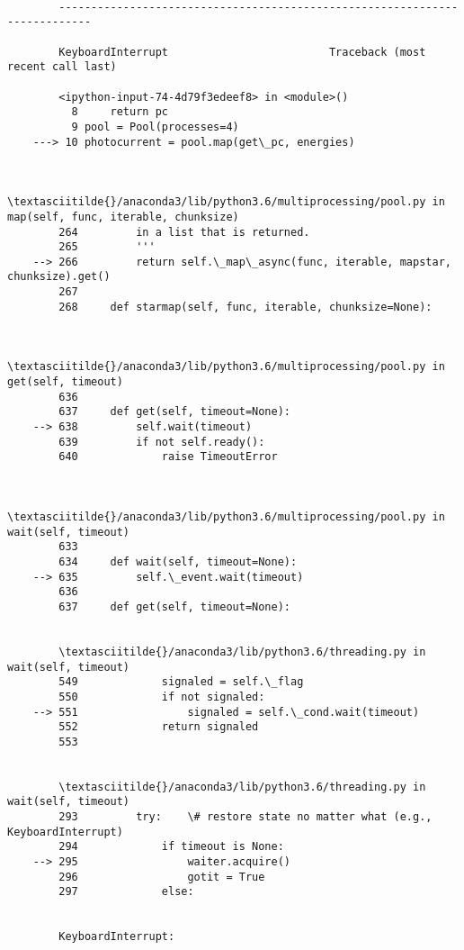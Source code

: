 \documentclass[11pt]{article}
\begin{document}
    \begin{Verbatim}[commandchars=\\\{\}]

        ---------------------------------------------------------------------------

        KeyboardInterrupt                         Traceback (most recent call last)

        <ipython-input-74-4d79f3edeef8> in <module>()
          8     return pc
          9 pool = Pool(processes=4)
    ---> 10 photocurrent = pool.map(get\_pc, energies)
    

        \textasciitilde{}/anaconda3/lib/python3.6/multiprocessing/pool.py in map(self, func, iterable, chunksize)
        264         in a list that is returned.
        265         '''
    --> 266         return self.\_map\_async(func, iterable, mapstar, chunksize).get()
        267 
        268     def starmap(self, func, iterable, chunksize=None):


        \textasciitilde{}/anaconda3/lib/python3.6/multiprocessing/pool.py in get(self, timeout)
        636 
        637     def get(self, timeout=None):
    --> 638         self.wait(timeout)
        639         if not self.ready():
        640             raise TimeoutError


        \textasciitilde{}/anaconda3/lib/python3.6/multiprocessing/pool.py in wait(self, timeout)
        633 
        634     def wait(self, timeout=None):
    --> 635         self.\_event.wait(timeout)
        636 
        637     def get(self, timeout=None):


        \textasciitilde{}/anaconda3/lib/python3.6/threading.py in wait(self, timeout)
        549             signaled = self.\_flag
        550             if not signaled:
    --> 551                 signaled = self.\_cond.wait(timeout)
        552             return signaled
        553 


        \textasciitilde{}/anaconda3/lib/python3.6/threading.py in wait(self, timeout)
        293         try:    \# restore state no matter what (e.g., KeyboardInterrupt)
        294             if timeout is None:
    --> 295                 waiter.acquire()
        296                 gotit = True
        297             else:


        KeyboardInterrupt: 

    \end{Verbatim}
\end{document}
